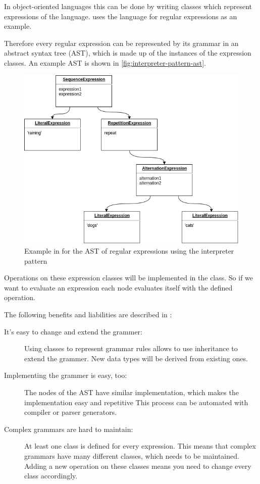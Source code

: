 \documentclass{llncs}
\begin{document}
In object-oriented languages this can be done by writing classes which represent expressions of the language. \cite{GHJV} uses the language for regular expressions as an example.

Therefore every regular expression can be represented by its grammar in an abstract syntax tree (AST), which is made up of the instances of the expression classes. An example AST is shown in \autoref{fig:interpreter-pattern-ast}.

\begin{figure}[h]
	\centering
	\includegraphics[width=\textwidth]{img/Interpreter-Pattern-AST-Example}
	\caption{Example in \cite{GHJV} for the AST of regular expressions using the interpreter pattern }
	\label{fig:interpreter-pattern-ast}
\end{figure} 

Operations on these expression classes will be implemented in the class. So if we want to evaluate an expression each node evaluates itself with the defined operation.

The following benefits and liabilities are described in \cite{GHJV}:

\begin{description}
	\item[It's easy to change and extend the grammer:] Using classes to represent grammar rules allows to use inheritance to extend the grammer. New data types will be derived from existing ones.
	\item[Implementing the grammer is easy, too:] The nodes of the AST have similar implementation, which makes the implementation easy and repetitive This process can be automated with compiler or parser generators.
	\item[Complex grammars are hard to maintain:] At least one class is defined for every expression. This means that complex grammars have many different classes, which needs to be maintained. Adding a new operation on these classes means you need to change every class accordingly.
\end{description}
\end{document}
